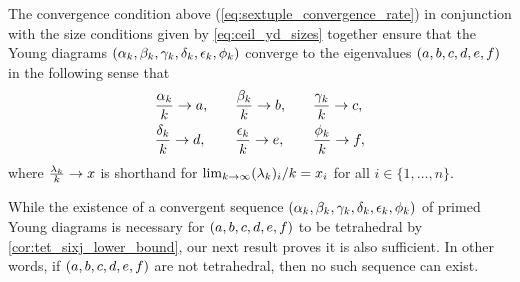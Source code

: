 \documentclass[notitlepage, 10pt]{article}
\begin{document}
\begin{rem}
    The convergence condition above (\cref{eq:sextuple_convergence_rate}) in conjunction with the size conditions given by \cref{eq:ceil_yd_sizes} together ensure that the Young diagrams $(\alpha_k, \beta_k, \gamma_k, \delta_k, \epsilon_k, \phi_k)$ converge to the eigenvalues $(a,b,c,d,e,f)$ in the following sense that
    \begin{equation}
        \label{eq:sextuple_convergence}
        \begin{alignedat}{3}
            & \frac{\alpha_k}{k} \rightarrow a, \qquad
            && \frac{\beta_k}{k} \rightarrow b, \qquad
            && \frac{\gamma_k}{k} \rightarrow c, \\
            & \frac{\delta_k}{k} \rightarrow d, \qquad
            && \frac{\epsilon_k}{k} \rightarrow e, \qquad
            && \frac{\phi_k}{k} \rightarrow f,
        \end{alignedat}
    \end{equation}
    where $\frac{\lambda_k}{k} \rightarrow x$ is shorthand for $\lim_{k\to \infty} (\lambda_k)_i/k = x_i$ for all $i \in \{1,\ldots, n\}$.
\end{rem}

While the existence of a convergent sequence $(\alpha_k, \beta_k, \gamma_k, \delta_k, \epsilon_k, \phi_k)$ of primed Young diagrams is necessary for $(a,b,c,d,e,f)$ to be tetrahedral by \cref{cor:tet_sixj_lower_bound}, our next result proves it is also sufficient.
In other words, if $(a,b,c,d,e,f)$ are not tetrahedral, then no such sequence can exist.
\end{document}
